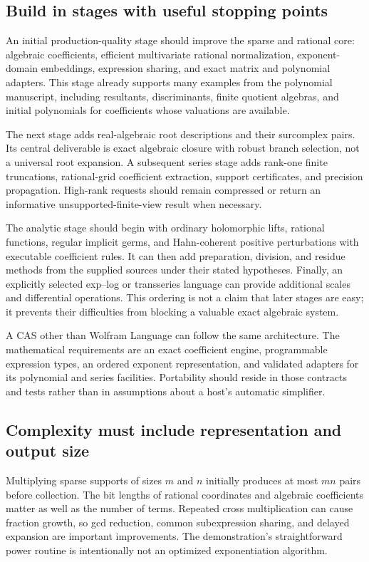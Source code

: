 \documentclass[11pt,letterpaper]{article}
\numberwithin{equation}{section}
\theoremstyle{definition}
\theoremstyle{remark}\newtheorem{remark}[theorem]{Remark}
\begin{document}
\subsection{Build in stages with useful stopping points}
An initial production-quality stage should improve the sparse and rational
core: algebraic coefficients, efficient multivariate rational normalization,
exponent-domain embeddings, expression sharing, and exact matrix and polynomial
adapters. This stage already supports many examples from the polynomial
manuscript, including resultants, discriminants, finite quotient algebras,
and initial polynomials for coefficients whose valuations are available.

The next stage adds real-algebraic root descriptions and their surcomplex
pairs. Its central deliverable is exact algebraic closure with robust branch
selection, not a universal root expansion. A subsequent series stage adds
rank-one finite truncations, rational-grid coefficient extraction, support
certificates, and precision propagation. High-rank requests should remain
compressed or return an informative unsupported-finite-view result when
necessary.

The analytic stage should begin with ordinary holomorphic lifts, rational
functions, regular implicit germs, and Hahn-coherent positive perturbations
with executable coefficient rules. It can then add preparation, division,
and residue methods from the supplied sources under their stated hypotheses.
Finally, an explicitly selected exp--log or transseries language can provide
additional scales and differential operations. This ordering is not a claim
that later stages are easy; it prevents their difficulties from blocking a
valuable exact algebraic system.

A CAS other than Wolfram Language can follow the same architecture. The
mathematical requirements are an exact coefficient engine, programmable
expression types, an ordered exponent representation, and validated adapters
for its polynomial and series facilities. Portability should reside in those
contracts and tests rather than in assumptions about a host's automatic
simplifier.

\subsection{Complexity must include representation and output size}
Multiplying sparse supports of sizes $m$ and $n$ initially produces at most
$mn$ pairs before collection. The bit lengths of rational coordinates and
algebraic coefficients matter as well as the number of terms. Repeated
cross multiplication can cause fraction growth, so gcd reduction, common
subexpression sharing, and delayed expansion are important improvements.
The demonstration's straightforward power routine is intentionally not an
optimized exponentiation algorithm.
\end{document}
